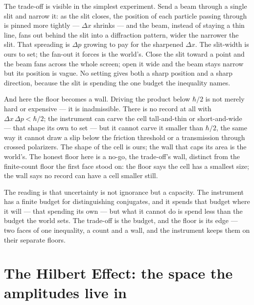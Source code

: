 The trade-off is visible in the simplest experiment. Send a beam through a single slit and narrow it: as the
slit closes, the position of each particle passing through is pinned more tightly --- $\Delta x$ shrinks ---
and the beam, instead of staying a thin line, fans out behind the slit into a diffraction pattern, wider the
narrower the slit. That spreading is $\Delta p$ growing to pay for the sharpened $\Delta x$. The slit-width is
ours to set; the fan-out it forces is the world's. Close the slit toward a point and the beam fans across the
whole screen; open it wide and the beam stays narrow but its position is vague. No setting gives both a sharp
position and a sharp direction, because the slit is spending the one budget the inequality names.

And here the floor becomes a wall. Driving the product below $\hbar/2$ is not merely hard or expensive --- it
is inadmissible. There is no record at all with $\Delta x\,\Delta p < \hbar/2$; the instrument can carve the
cell tall-and-thin or short-and-wide --- that shape its own to set --- but it cannot carve it smaller than
$\hbar/2$, the same way it cannot draw a slip below the friction threshold or a transmission through crossed
polarizers. The shape of the cell is ours; the wall that caps its area is the world's. The honest floor here
is a no-go, the trade-off's wall, distinct from the finite-count floor the first face stood on: the floor
says the cell has a smallest size; the wall says no record can have a cell smaller still.

The reading is that uncertainty is not ignorance but a capacity. The instrument has a finite budget for
distinguishing conjugates, and it spends that budget where it will --- that spending its own --- but what it
cannot do is spend less than the budget the world sets. The trade-off is the budget, and the floor is its
edge --- two faces of one inequality, a count and a wall, and the instrument keeps them on their separate
floors.

\section{The Hilbert Effect: the space the amplitudes live in}
\label{se:hilbert}

